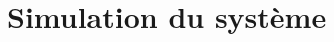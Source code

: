 \documentclass[openany,a4paper,12pt]{article}
\begin{document}
\section{Simulation du système}



		
\printbibliography
\end{document}
